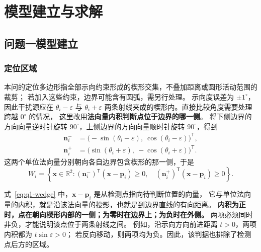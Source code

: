 \documentclass[UTF8,a4paper,12pt]{ctexart}
\begin{document}
\section{模型建立与求解}
\subsection{问题一模型建立}
\label{sec:q1}

\subsubsection{定位区域}
\label{sec:q1-wedge}




本问的定位多边形指全部示向约束形成的楔形交集，不叠加距离或圆形活动范围的裁剪；
若加入这些约束，边界可能含有圆弧，需另行处理。
示向度误差为 $\pm1^\circ$，因此干扰源应在 $\theta_i-\varepsilon$ 与
$\theta_i+\varepsilon$ 两条射线夹成的楔形内。直接比较角度需要处理跨越 $0^\circ$ 的情况，
这里改用\textbf{法向量内积判断点位于边界的哪一侧}。
将下侧边界的方向向量逆时针旋转 $90^\circ$，上侧边界的方向向量顺时针旋转 $90^\circ$，得到
\[
  \begin{aligned}
    \boldsymbol n_i^-&=\bigl(-\sin(\theta_i-\varepsilon),\ \cos(\theta_i-\varepsilon)\bigr)^{\mathsf T},\\
    \boldsymbol n_i^+&=\bigl(\sin(\theta_i+\varepsilon),\ -\cos(\theta_i+\varepsilon)\bigr)^{\mathsf T}.
  \end{aligned}
\]
这两个单位法向量分别朝向各自边界包含楔形的那一侧，于是
\begin{equation}
  W_i=\left\{\boldsymbol x\in\mathbb R^2:
  (\boldsymbol n_i^-)^{\mathsf T}(\boldsymbol x-\boldsymbol p_i)\geq0,\quad
  (\boldsymbol n_i^+)^{\mathsf T}(\boldsymbol x-\boldsymbol p_i)\geq0\right\}.
  \label{eq:q1-wedge}
\end{equation}


式~\eqref{eq:q1-wedge} 中，$\boldsymbol x-\boldsymbol p_i$ 是从检测点指向待判断位置的向量，
它与单位法向量的内积，就是沿该法向量的投影，也就是到边界直线的有向距离。
\textbf{内积为正时，点在朝向楔形内部的一侧；为零时在边界上；为负时在外侧。}
两项必须同时非负，才能说明该点位于两条射线之间。
例如，沿示向方向前进距离 $t>0$，两项内积都为 $t\sin\varepsilon>0$；
若反向移动，则两项均为负。因此，该判据也排除了检测点后方的区域。
\end{document}
